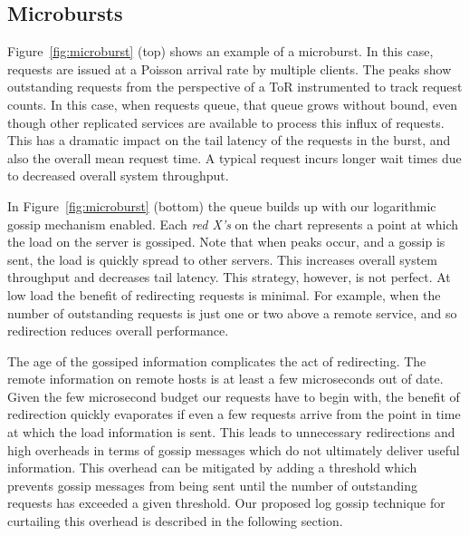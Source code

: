 


\subsection{Microbursts}

Figure~\ref{fig:microburst} (top) shows an example of a microburst. In this
case, requests are issued at a Poisson arrival rate by multiple clients.  The
peaks show outstanding requests from the perspective of a ToR instrumented to
track request counts. In this case, when requests queue, that queue grows
without bound, even though other replicated services are available to process
this influx of requests. This has a dramatic impact on the tail latency of the
requests in the burst, and also the overall mean request time. A typical
request incurs longer wait times due to decreased overall system throughput.

In Figure~\ref{fig:microburst} (bottom) the queue builds up with our
logarithmic gossip mechanism enabled. Each \textit{red X's} on the chart
represents a point at which the load on the server is gossiped.  Note that when
peaks occur, and a gossip is sent, the load is quickly spread to other servers.
This increases overall system throughput and decreases tail latency. This
strategy, however, is not perfect. At low load the benefit of redirecting
requests is minimal. For example, when the number of outstanding requests is
just one or two above a remote service, and so redirection reduces overall
performance.

The age of the gossiped information complicates the act of redirecting. The
remote information on remote hosts is at least a few microseconds out of date.
Given the few microsecond budget our requests have to begin with, the benefit
of redirection quickly evaporates if even a few requests arrive from the point
in time at which the load information is sent.  This leads to unnecessary
redirections and high overheads in terms of gossip messages which do not
ultimately deliver useful information. This overhead can be mitigated by adding
a threshold which prevents gossip messages from being sent until the number of
outstanding requests has exceeded a given threshold.  Our proposed log gossip
technique for curtailing this overhead is described in the following section.


